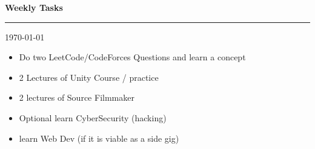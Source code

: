 \documentclass[12pt]{article}
\begin{document}
\begin{center}
    \Huge \textbf{Weekly Tasks}
\end{center}

\rule{\linewidth}{1.5pt}

\vspace{5pt}
\begin{center}
    \large \today
\end{center}
\vspace{20pt} %


%
%
\begin{itemize}

    \fontsize{20}{20}\selectfont

    \item Do two LeetCode/CodeForces Questions and learn a concept\vfill 

    \item 2 Lectures of Unity Course / practice\vfill 

    \item 2 lectures of Source Filmmaker\vfill 

    \item Optional learn CyberSecurity (hacking)\vfill 

    \item learn Web Dev (if it is viable as a side gig) \vfill 


\end{itemize}


\end{document}
